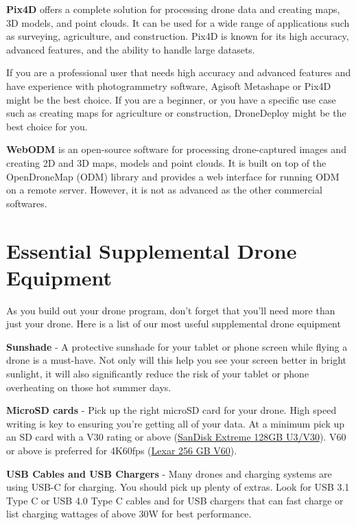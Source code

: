 \documentclass[
  12pt,
]{book}
\begin{document}
\textbf{Pix4D} offers a complete solution for processing drone data and creating maps, 3D models, and point clouds. It can be used for a wide range of applications such as surveying, agriculture, and construction. Pix4D is known for its high accuracy, advanced features, and the ability to handle large datasets.

If you are a professional user that needs high accuracy and advanced features and have experience with photogrammetry software, Agisoft Metashape or Pix4D might be the best choice. If you are a beginner, or you have a specific use case such as creating maps for agriculture or construction, DroneDeploy might be the best choice for you.

\textbf{WebODM} is an open-source software for processing drone-captured images and creating 2D and 3D maps, models and point clouds. It is built on top of the OpenDroneMap (ODM) library and provides a web interface for running ODM on a remote server. However, it is not as advanced as the other commercial softwares.

\hypertarget{essential-supplemental-drone-equipment}{%
\section{Essential Supplemental Drone Equipment}\label{essential-supplemental-drone-equipment}}

As you build out your drone program, don't forget that you'll need more than just your drone. Here is a list of our most useful supplemental drone equipment

\textbf{Sunshade} - A protective sunshade for your tablet or phone screen while flying a drone is a must-have. Not only will this help you see your screen better in bright sunlight, it will also significantly reduce the risk of your tablet or phone overheating on those hot summer days.

\textbf{MicroSD cards} - Pick up the right microSD card for your drone. High speed writing is key to ensuring you're getting all of your data. At a minimum pick up an SD card with a V30 rating or above (\href{https://www.amazon.com/SanDisk-Extreme-microSDXC-Memory-Adapter/dp/B07FCMKK5X?th=1}{SanDisk Extreme 128GB U3/V30}). V60 or above is preferred for 4K60fps (\href{https://www.amazon.com/Lexar-microSDXC-Professional-Adapter-Class10/dp/B09FJHMLC6/}{Lexar 256 GB V60}).

\textbf{USB Cables and USB Chargers} - Many drones and charging systems are using USB-C for charging. You should pick up plenty of extras. Look for USB 3.1 Type C or USB 4.0 Type C cables and for USB chargers that can fast charge or list charging wattages of above 30W for best performance.
\end{document}

